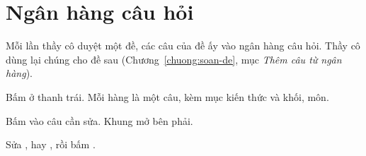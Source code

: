 \chapter{Ngân hàng câu hỏi}

Mỗi lần thầy cô duyệt một đề, các câu của đề ấy vào ngân hàng câu hỏi. Thầy cô dùng lại chúng cho đề sau
(Chương~\ref{chuong:soan-de}, mục \emph{Thêm câu từ ngân hàng}).



Bấm  ở thanh trái. Mỗi hàng là một câu, kèm mục kiến thức và khối, môn.



\begin{buoc}
  \item Bấm vào câu cần sửa. Khung  mở bên phải.
  \item Sửa ,  hay , rồi bấm .
\end{buoc}

